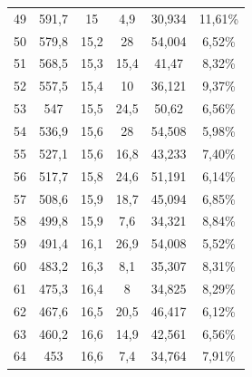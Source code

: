 \begin{longtable}[H]{cccccc}
  49          & 591,7                & 15            & 4,9            & 30,934        & 11,61\%                            \\
  50          & 579,8                & 15,2          & 28             & 54,004        & 6,52\%                             \\
  51          & 568,5                & 15,3          & 15,4           & 41,47         & 8,32\%                             \\
  52          & 557,5                & 15,4          & 10             & 36,121        & 9,37\%                             \\
  53          & 547                  & 15,5          & 24,5           & 50,62         & 6,56\%                             \\
  54          & 536,9                & 15,6          & 28             & 54,508        & 5,98\%                             \\
  55          & 527,1                & 15,6          & 16,8           & 43,233        & 7,40\%                             \\
  56          & 517,7                & 15,8          & 24,6           & 51,191        & 6,14\%                             \\
  57          & 508,6                & 15,9          & 18,7           & 45,094        & 6,85\%                             \\
  58          & 499,8                & 15,9          & 7,6            & 34,321        & 8,84\%                             \\
  59          & 491,4                & 16,1          & 26,9           & 54,008        & 5,52\%                             \\
  60          & 483,2                & 16,3          & 8,1            & 35,307        & 8,31\%                             \\
  61          & 475,3                & 16,4          & 8              & 34,825        & 8,29\%                             \\
  62          & 467,6                & 16,5          & 20,5           & 46,417        & 6,12\%                             \\
  63          & 460,2                & 16,6          & 14,9           & 42,561        & 6,56\%                             \\
  64          & 453                  & 16,6          & 7,4            & 34,764        & 7,91\%                             \\

\end{longtable}
